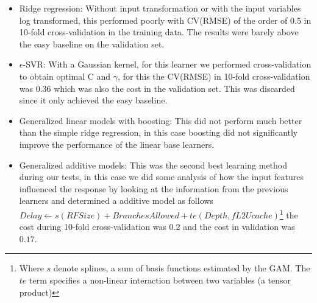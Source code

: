 \documentclass[a4paper, 11pt]{article}
\begin{document}
\begin{itemize}
	\item Ridge regression: Without input transformation or with the input variables log transformed, this performed poorly with CV(RMSE) of the order of 0.5 in 10-fold cross-validation in the training data. The results were barely above the easy baseline on the validation set.
	\item $\epsilon$-SVR: With a Gaussian kernel, for this learner we performed cross-validation to obtain optimal C and $\gamma$, for this the CV(RMSE) in 10-fold cross-validation was 0.36 which was also the cost in the validation set. This was discarded since it only achieved the easy baseline.
	\item Generalized linear models with boosting: This did not perform much better than the simple ridge regression, in this case boosting did not significantly improve the performance of the linear base learners.
    \item Generalized additive models: This was the second best learning method during our tests, in this case we did some analysis of how the input features influenced the response by looking at the information from the previous learners and determined a additive model as follows $Delay \leftarrow s(RFSize)+ BranchesAllowed + te(Depth, fL2Ucache)$\footnote{Where $s$ denote splines, a sum of basis functions estimated by the GAM. The $te$ term specifies a non-linear interaction between two variables (a tensor product)}  the cost during 10-fold cross-validation was $0.2$ and the cost in validation was $0.17$.
	
\end{itemize}



\end{document}
